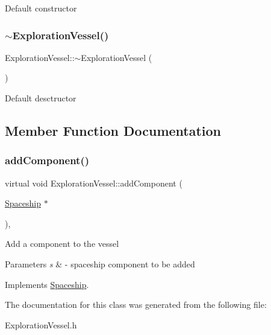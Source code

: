 Default constructor \mbox{\label{classExplorationVessel_ac7b29c63250f7263808af4e21e412cce}} 
\subsubsection{\texorpdfstring{$\sim$\+Exploration\+Vessel()}{~ExplorationVessel()}}
{\footnotesize\ttfamily Exploration\+Vessel\+::$\sim$\+Exploration\+Vessel (\begin{DoxyParamCaption}{ }\end{DoxyParamCaption})\hspace{0.3cm}{\ttfamily [inline]}}

Default desctructor 

\subsection{Member Function Documentation}
\mbox{\label{classExplorationVessel_ab7a52cecc1b68a5b9b1c478b00d67f65}} 
\subsubsection{\texorpdfstring{add\+Component()}{addComponent()}}
{\footnotesize\ttfamily virtual void Exploration\+Vessel\+::add\+Component (\begin{DoxyParamCaption}\item[{\hyperlink{classSpaceship}{Spaceship} $\ast$}]{ }\end{DoxyParamCaption})\hspace{0.3cm}{\ttfamily [inline]}, {\ttfamily [virtual]}}

Add a component to the vessel 
\begin{DoxyParams}{Parameters}
{\em s} & -\/ spaceship component to be added \\
\hline
\end{DoxyParams}


Implements \hyperlink{classSpaceship_ac1b4673a691cd100708ddea08cd9f192}{Spaceship}.



The documentation for this class was generated from the following file\+:\begin{DoxyCompactItemize}
\item 
Exploration\+Vessel.\+h\end{DoxyCompactItemize}
